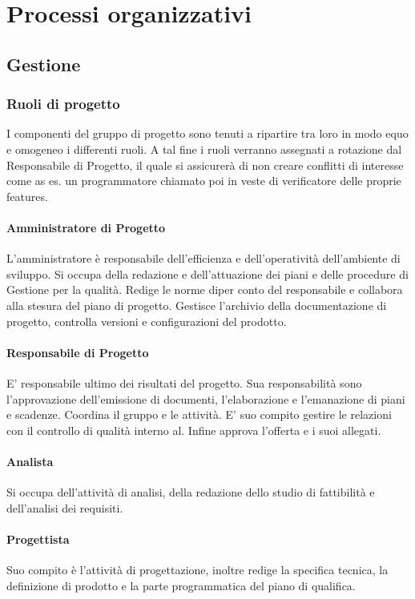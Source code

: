 \section{Processi organizzativi}
\subsection{Gestione}
\subsubsection{Ruoli di progetto}
I componenti del gruppo di progetto sono tenuti a ripartire tra loro in modo equo e omogeneo i differenti ruoli. A tal fine i ruoli verranno assegnati a rotazione dal Responsabile di Progetto, il quale si assicurerà di non creare conflitti di interesse come as es. un programmatore chiamato poi in veste di verificatore delle proprie features.
\paragraph{Amministratore di Progetto} L'amministratore è responsabile dell'efficienza e dell'operatività dell'ambiente di sviluppo. Si occupa della redazione e dell'attuazione dei piani e delle procedure di Gestione per la qualità. Redige le norme diper conto del responsabile e collabora alla stesura del piano di progetto. Gestisce l'archivio della documentazione di progetto, controlla versioni e configurazioni del prodotto.
\paragraph{Responsabile di Progetto}E' responsabile ultimo dei risultati del progetto. Sua responsabilità sono l'approvazione dell'emissione di documenti, l'elaborazione e l'emanazione di piani e scadenze. Coordina il gruppo e le attività. E' suo compito gestire le relazioni con il controllo di qualità interno al. Infine approva l'offerta e i suoi allegati.
\paragraph{Analista} Si occupa dell'attività di analisi, della redazione dello studio di fattibilità e dell'analisi dei requisiti.
\paragraph{Progettista} Suo compito è l'attività di progettazione, inoltre redige la specifica tecnica, la definizione di prodotto e la parte programmatica del piano di qualifica. 

